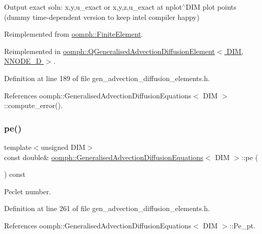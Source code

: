 Output exact soln\+: x,y,u\+\_\+exact or x,y,z,u\+\_\+exact at nplot$^\wedge$\+D\+IM plot points (dummy time-\/dependent version to keep intel compiler happy) 



Reimplemented from \hyperlink{classoomph_1_1FiniteElement_a2a8426dccd57b927be0ae0eec00d0479}{oomph\+::\+Finite\+Element}.



Reimplemented in \hyperlink{classoomph_1_1QGeneralisedAdvectionDiffusionElement_ab8bec1be15a037df4628282d01ca57a7}{oomph\+::\+Q\+Generalised\+Advection\+Diffusion\+Element$<$ D\+I\+M, N\+N\+O\+D\+E\+\_\+D $>$}.



Definition at line 189 of file gen\+\_\+advection\+\_\+diffusion\+\_\+elements.\+h.



References oomph\+::\+Generalised\+Advection\+Diffusion\+Equations$<$ D\+I\+M $>$\+::compute\+\_\+error().

\mbox{\label{classoomph_1_1GeneralisedAdvectionDiffusionEquations_a690a83d5a63684541aac450255eed7e1}} 
\subsubsection{\texorpdfstring{pe()}{pe()}}
{\footnotesize\ttfamily template$<$unsigned D\+IM$>$ \\
const double\& \hyperlink{classoomph_1_1GeneralisedAdvectionDiffusionEquations}{oomph\+::\+Generalised\+Advection\+Diffusion\+Equations}$<$ D\+IM $>$\+::pe (\begin{DoxyParamCaption}{ }\end{DoxyParamCaption}) const\hspace{0.3cm}{\ttfamily [inline]}}



Peclet number. 



Definition at line 261 of file gen\+\_\+advection\+\_\+diffusion\+\_\+elements.\+h.



References oomph\+::\+Generalised\+Advection\+Diffusion\+Equations$<$ D\+I\+M $>$\+::\+Pe\+\_\+pt.

